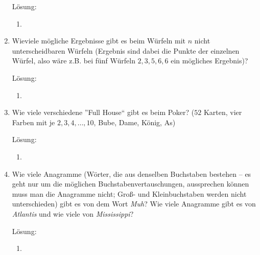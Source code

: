 \documentclass[../main.tex]{subfiles}
\begin{document}
\begin{enumerate}
	      Lösung:
	      \begin{enumerate}
		      \item
	      \end{enumerate}
	\item Wieviele mögliche Ergebnisse gibt es beim Würfeln mit \( n \) nicht unterscheidbaren
	      Würfeln (Ergebnis sind dabei die Punkte der einzelnen Würfel,
	      also wäre z.B. bei fünf Würfeln \( 2,3,5,6,6 \) ein mögliches Ergebnis)?

	      Lösung:
	      \begin{enumerate}
		      \item
	      \end{enumerate}
	\item Wie viele verschiedene ”Full House“ gibt es beim Poker?
	      (\( 52 \) Karten, vier Farben mit je \( 2,3,4, \dots, 10 \), Bube, Dame, König, As)

	      Lösung:
	      \begin{enumerate}
		      \item
	      \end{enumerate}
	\item Wie viele Anagramme (Wörter, die aus denselben Buchstaben bestehen – es
	      geht nur um die möglichen Buchstabenvertauschungen, aussprechen können
	      muss man die Anagramme nicht; Groß- und Kleinbuchstaben werden nicht
	      unterschieden) gibt es von dem Wort \textit{Muh}? Wie viele Anagramme gibt es
	      von \textit{Atlantis} und wie viele von \textit{Mississippi}?

	      Lösung:
	      \begin{enumerate}
		      \item
	      \end{enumerate}
\end{enumerate}
\end{document}
